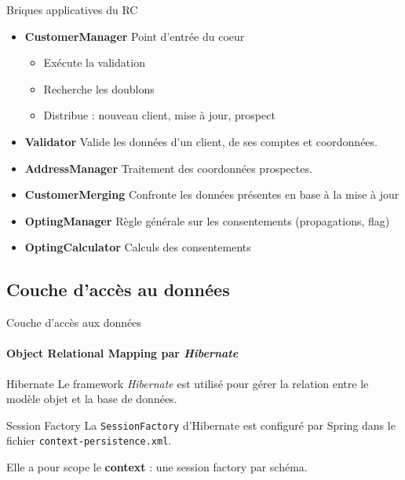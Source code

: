 \documentclass[compact]{beamer}%
\begin{document}
\begin{frame}{Briques applicatives du RC}

	\begin{itemize}
	\item \textbf{CustomerManager} Point d'entrée du coeur
		\begin{itemize}
		\item Exécute la validation
		\item Recherche les doublons
		\item Distribue : nouveau client, mise à jour, prospect
		\end{itemize}
	\item \textbf{Validator} Valide les données d'un client, de ses comptes et coordonnées.
	\item \textbf{AddressManager} Traitement des coordonnées prospectes.
	\item \textbf{CustomerMerging} Confronte les données présentes en base à la mise à jour
	\item \textbf{OptingManager} Règle générale sur les consentements (propagations, flag)
	\item \textbf{OptingCalculator} Calculs des consentements
	\end{itemize}
	
\end{frame}

\subsection{Couche d'accès au données}

\begin{frame}{Couche d'accès aux données}
	\framesubtitle{Object Relational Mapping par \emph{Hibernate}}
	
	\begin{block}{Hibernate}
	Le framework \emph{Hibernate} est utilisé pour gérer la relation entre le modèle objet et la base de données.
	\end{block}
	
	\pause
	\begin{block}{Session Factory}
	La \texttt{SessionFactory} d'Hibernate est configuré par Spring dans le fichier \texttt{context-persistence.xml}.\par
	Elle a pour scope le \textbf{context} : une session factory par schéma.	
	\end{block}

\end{frame}
\end{document}
